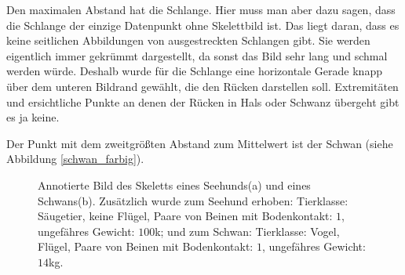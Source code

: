  Den maximalen Abstand hat die Schlange. Hier muss man aber dazu sagen, dass die Schlange der einzige Datenpunkt ohne Skelettbild ist. Das liegt daran, dass es keine seitlichen Abbildungen von ausgestreckten Schlangen gibt. Sie werden eigentlich immer gekrümmt dargestellt, da sonst das Bild sehr lang und schmal werden würde. Deshalb wurde für die Schlange eine horizontale Gerade knapp über dem unteren Bildrand gewählt, die den Rücken darstellen soll. Extremitäten und ersichtliche Punkte an denen der Rücken in Hals oder Schwanz übergeht gibt es ja keine.
 
 Der Punkt mit dem zweitgrößten Abstand zum Mittelwert ist der Schwan (siehe Abbildung \ref{schwan_farbig}).
 
 \begin{figure}
  \qquad
  
  \caption{Annotierte Bild des Skeletts eines Seehunds(a) und eines Schwans(b). Zusätzlich wurde zum Seehund erhoben:
  Tierklasse: Säugetier, keine Flügel, Paare von Beinen mit Bodenkontakt: $1$, ungefähres Gewicht: $100$k; und zum Schwan: Tierklasse: Vogel, Flügel, Paare von Beinen mit Bodenkontakt: $1$, ungefähres Gewicht: $14$kg.}
 \end{figure}

